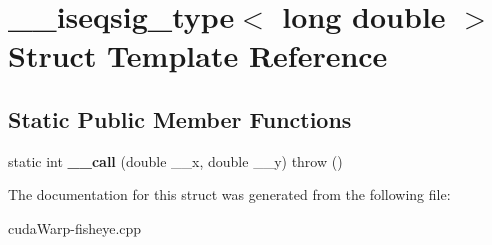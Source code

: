 \hypertarget{struct____iseqsig__type_3_01long_01double_01_4}{}\section{\+\_\+\+\_\+iseqsig\+\_\+type$<$ long double $>$ Struct Template Reference}
\label{struct____iseqsig__type_3_01long_01double_01_4}
\subsection*{Static Public Member Functions}
\begin{DoxyCompactItemize}
\item 
static int {\bfseries \+\_\+\+\_\+call} (double \+\_\+\+\_\+x, double \+\_\+\+\_\+y)  throw ()\hypertarget{struct____iseqsig__type_3_01long_01double_01_4_a48f733146cb65236a727a0cfe494279b}{}\label{struct____iseqsig__type_3_01long_01double_01_4_a48f733146cb65236a727a0cfe494279b}

\end{DoxyCompactItemize}


The documentation for this struct was generated from the following file\+:\begin{DoxyCompactItemize}
\item 
cuda\+Warp-\/fisheye.\+cpp\end{DoxyCompactItemize}
